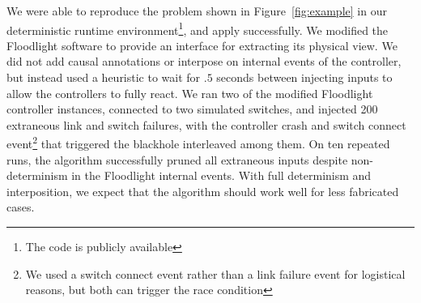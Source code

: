
We were able to reproduce the problem shown in Figure~\ref{fig:example} in our
deterministic runtime environment\footnote{The code is publicly available},
and apply \simulator{} successfully.
We modified the Floodlight software to provide an interface for extracting its
physical view. We did not add causal
annotations or interpose on internal events of the controller, but instead used a
heuristic to wait for $.5$ seconds between injecting inputs to allow the
controllers to fully react. We ran two of the modified Floodlight controller
instances, connected to two simulated switches, and injected 200 extraneous link
and switch failures, with the controller crash and switch connect event\footnote{We used a switch connect
event rather than a link failure event for logistical reasons, but both
can trigger the race condition} that triggered the blackhole interleaved among them.
On ten repeated runs, the algorithm successfully pruned all extraneous
inputs despite non-determinism in the Floodlight internal events. With full determinism and
interposition, we expect that the algorithm should work well for less
fabricated cases.
